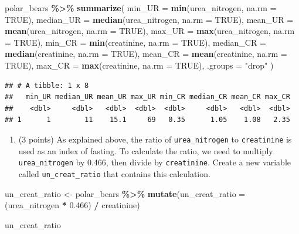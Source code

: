 \documentclass[
]{article}
\newenvironment{Shaded}{\begin{snugshade}}{\end{snugshade}}
\newcommand{\AttributeTok}[1]{\textcolor[rgb]{0.13,0.29,0.53}{#1}}
\newcommand{\ConstantTok}[1]{\textcolor[rgb]{0.56,0.35,0.01}{#1}}
\newcommand{\FloatTok}[1]{\textcolor[rgb]{0.00,0.00,0.81}{#1}}
\newcommand{\FunctionTok}[1]{\textcolor[rgb]{0.13,0.29,0.53}{\textbf{#1}}}
\newcommand{\NormalTok}[1]{#1}
\newcommand{\OtherTok}[1]{\textcolor[rgb]{0.56,0.35,0.01}{#1}}
\newcommand{\SpecialCharTok}[1]{\textcolor[rgb]{0.81,0.36,0.00}{\textbf{#1}}}
\newcommand{\StringTok}[1]{\textcolor[rgb]{0.31,0.60,0.02}{#1}}
\providecommand{\tightlist}{%
  \setlength{\itemsep}{0pt}\setlength{\parskip}{0pt}}
\begin{document}
\begin{Shaded}
\begin{Highlighting}[]
\NormalTok{polar\_bears }\SpecialCharTok{\%\textgreater{}\%} 
\FunctionTok{summarize}\NormalTok{(}
    \AttributeTok{min\_UR =} \FunctionTok{min}\NormalTok{(urea\_nitrogen, }\AttributeTok{na.rm =} \ConstantTok{TRUE}\NormalTok{),}
    \AttributeTok{median\_UR =} \FunctionTok{median}\NormalTok{(urea\_nitrogen, }\AttributeTok{na.rm =} \ConstantTok{TRUE}\NormalTok{),}
    \AttributeTok{mean\_UR =} \FunctionTok{mean}\NormalTok{(urea\_nitrogen, }\AttributeTok{na.rm =} \ConstantTok{TRUE}\NormalTok{),}
    \AttributeTok{max\_UR =} \FunctionTok{max}\NormalTok{(urea\_nitrogen, }\AttributeTok{na.rm =} \ConstantTok{TRUE}\NormalTok{),}
    \AttributeTok{min\_CR =} \FunctionTok{min}\NormalTok{(creatinine, }\AttributeTok{na.rm =} \ConstantTok{TRUE}\NormalTok{),}
    \AttributeTok{median\_CR =} \FunctionTok{median}\NormalTok{(creatinine, }\AttributeTok{na.rm =} \ConstantTok{TRUE}\NormalTok{),}
    \AttributeTok{mean\_CR =} \FunctionTok{mean}\NormalTok{(creatinine, }\AttributeTok{na.rm =} \ConstantTok{TRUE}\NormalTok{),}
    \AttributeTok{max\_CR =} \FunctionTok{max}\NormalTok{(creatinine, }\AttributeTok{na.rm =} \ConstantTok{TRUE}\NormalTok{),}
    \AttributeTok{.groups =} \StringTok{"drop"}
\NormalTok{  )}
\end{Highlighting}
\end{Shaded}

\begin{verbatim}
## # A tibble: 1 x 8
##   min_UR median_UR mean_UR max_UR min_CR median_CR mean_CR max_CR
##    <dbl>     <dbl>   <dbl>  <dbl>  <dbl>     <dbl>   <dbl>  <dbl>
## 1      1        11    15.1     69   0.35      1.05    1.08   2.35
\end{verbatim}

\begin{enumerate}
\def\labelenumi{\arabic{enumi}.}
\setcounter{enumi}{5}
\tightlist
\item
  (3 points) As explained above, the ratio of \texttt{urea\_nitrogen} to
  \texttt{creatinine} is used as an index of fasting. To calculate the
  ratio, we need to multiply \texttt{urea\_nitrogen} by 0.466, then
  divide by \texttt{creatinine}. Create a new variable called
  \texttt{un\_creat\_ratio} that contains this calculation.
\end{enumerate}

\begin{Shaded}
\begin{Highlighting}[]
\NormalTok{un\_creat\_ratio }\OtherTok{\textless{}{-}}\NormalTok{ polar\_bears }\SpecialCharTok{\%\textgreater{}\%} 
  \FunctionTok{mutate}\NormalTok{(}\AttributeTok{un\_creat\_ratio =}\NormalTok{ (urea\_nitrogen }\SpecialCharTok{*} \FloatTok{0.466}\NormalTok{) }\SpecialCharTok{/}\NormalTok{ creatinine)}

\NormalTok{un\_creat\_ratio}
\end{Highlighting}
\end{Shaded}
\end{document}
